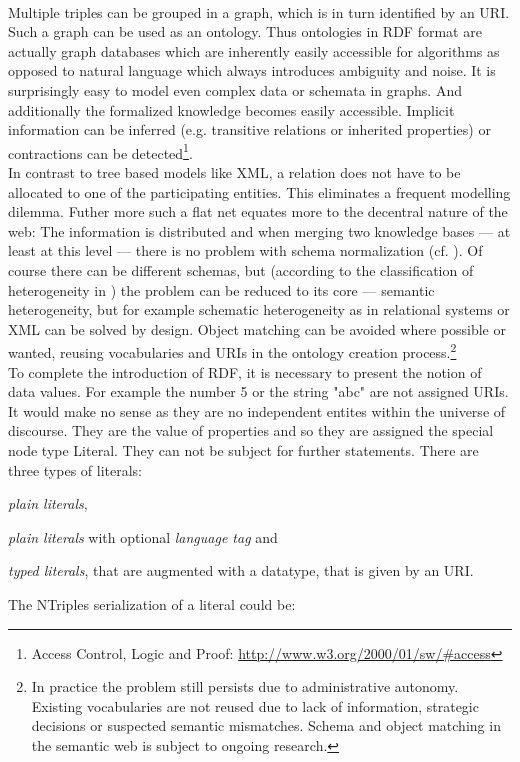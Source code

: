 \\
Multiple triples can be grouped in a graph, which is in turn identified by an URI. 
Such a graph can be used as an ontology. 
Thus ontologies in RDF format are actually graph databases which are inherently easily accessible for algorithms as opposed to natural language which always introduces ambiguity and noise. 
It is surprisingly easy to model even complex data or schemata in graphs. 
And additionally the formalized knowledge becomes easily accessible. 
Implicit information can be inferred (e.g. transitive relations or inherited properties) or contractions can be detected\footnote{Access Control, Logic and Proof: \url{http://www.w3.org/2000/01/sw/#access}}.\\
In contrast to tree based models like XML, a relation does not have to be allocated to one of the participating entities. 
This eliminates a frequent modelling dilemma. 
Futher more such a flat net equates more to the decentral nature of the web: The information is distributed and when merging two knowledge bases --- at least at this level --- there is no problem with schema normalization (cf. \cite{hitzler}). 
Of course there can be different schemas, but (according to the classification of heterogeneity in \cite{ouksel}) the problem can be reduced to its core --- semantic heterogeneity, but for example schematic heterogeneity as in relational systems or XML can be solved by design. 
Object matching can be avoided where possible or wanted, reusing vocabularies and URIs in the ontology creation process.\footnote{In practice the problem still persists due to administrative autonomy. 
Existing vocabularies are not reused due to lack of information, strategic decisions or suspected semantic mismatches. 
Schema and object matching in the semantic web is subject to ongoing research.}\\
To complete the introduction of RDF, it is necessary to present the notion of data values. For example the number 5 or the string "abc" are not assigned URIs. 
It would make no sense as they are no independent entites within the universe of discourse. 
They are the value of properties and so they are assigned the special node type  Literal. 
They can not be subject for further statements. 
There are three types of literals:
\begin{compactitem}
\item \textit{plain literals},
\item \textit{plain literals} with optional \textit{language tag} and 
\item \textit{typed literals}, that are augmented with a datatype, that is given by an URI.
\end{compactitem}
\vspace{0.2ex}
The NTriples serialization of a literal could be:

